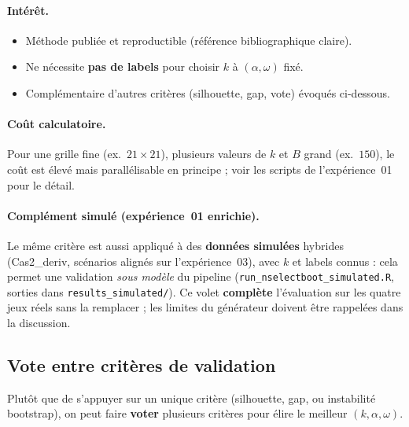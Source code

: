 \documentclass[11pt, a4paper]{article}
\begin{document}
\paragraph{Intérêt.}
\begin{itemize}[nosep]
  \item Méthode publiée et reproductible (référence bibliographique claire).
  \item Ne nécessite \textbf{pas de labels} pour choisir $k$ à $(\alpha,\omega)$
    fixé.
  \item Complémentaire d'autres critères (silhouette, gap, vote) évoqués
    ci-dessous.
\end{itemize}

\paragraph{Coût calculatoire.}
Pour une grille fine (ex.\ $21\times 21$), plusieurs valeurs de $k$ et $B$
grand (ex.\ $150$), le coût est élevé mais parallélisable en principe ; voir
les scripts de l'expérience~01 pour le détail.

\paragraph{Complément simulé (expérience~01 enrichie).}
Le même critère est aussi appliqué à des \textbf{données simulées} hybrides
(Cas2\_deriv, scénarios alignés sur l'expérience~03), avec $k$ et labels
connus : cela permet une validation \emph{sous modèle} du pipeline
(\texttt{run\_nselectboot\_simulated.R}, sorties dans
\texttt{results\_simulated/}). Ce volet \textbf{complète} l'évaluation sur les
quatre jeux réels sans la remplacer ; les limites du générateur doivent être
rappelées dans la discussion.

\subsection{Vote entre critères de validation}

Plutôt que de s'appuyer sur un unique critère (silhouette, gap, ou
instabilité bootstrap), on peut faire \textbf{voter} plusieurs critères pour élire le
meilleur $(k, \alpha, \omega)$.
\end{document}
